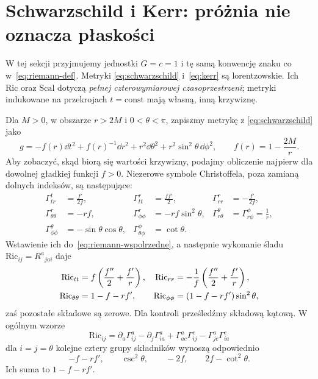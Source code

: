 \section{Schwarzschild i Kerr: próżnia nie oznacza płaskości}

W tej sekcji przyjmujemy jednostki $G=c=1$ i tę samą
konwencję znaku co w~\eqref{eq:riemann-def}. Metryki
\eqref{eq:schwarzschild} i~\eqref{eq:kerr} są
lorentzowskie. Ich $\mathrm{Ric}$ oraz $\mathrm{Scal}$
dotyczą \emph{pełnej czterowymiarowej czasoprzestrzeni};
metryki indukowane na przekrojach $t=\mathrm{const}$
mają własną, inną krzywiznę.

\begin{przyklad}
\label{prz:krzywizna-schwarzschild}
Dla $M>0$, w obszarze $r>2M$ i $0<\theta<\pi$, zapiszmy metrykę z
\eqref{eq:schwarzschild} jako
\[
 g=-f(r)\dd t^2+f(r)^{-1}\dd r^2
             +r^2\dd\theta^2+r^2\sin^2\theta\,\dd\phi^2,
 \qquad f(r)=1-\frac{2M}{r}.
\]
Aby zobaczyć, skąd biorą się wartości krzywizny,
podajmy obliczenie najpierw dla dowolnej gładkiej funkcji $f>0$.
Niezerowe symbole Christoffela, poza zamianą
dolnych indeksów, są następujące:
\begin{align*}
 \Gamma^t_{tr}&=\frac{f'}{2f},&
 \Gamma^r_{tt}&=\frac{ff'}2,&
 \Gamma^r_{rr}&=-\frac{f'}{2f},\\
 \Gamma^r_{\theta\theta}&=-rf,&
 \Gamma^r_{\phi\phi}&=-rf\sin^2\theta,&
 \Gamma^\theta_{r\theta}&=\Gamma^\phi_{r\phi}=\frac1r,\\
 \Gamma^\theta_{\phi\phi}&=-\sin\theta\cos\theta,&
 \Gamma^\phi_{\theta\phi}&=\cot\theta.
\end{align*}
Wstawienie ich do~\eqref{eq:riemann-wspolrzedne},
a następnie wykonanie śladu
$\mathrm{Ric}_{ij}=R^a{}_{j a i}$ daje
\begin{align}\label{eq:ricci-f-sferyczna}
 \mathrm{Ric}_{tt}&=f\left(\frac{f''}{2}+\frac{f'}r\right),
 &\mathrm{Ric}_{rr}&=-\frac1f
               \left(\frac{f''}{2}+\frac{f'}r\right),\notag\\
 \mathrm{Ric}_{\theta\theta}&=1-f-rf',
 &\mathrm{Ric}_{\phi\phi}&=(1-f-rf')\sin^2\theta,
\end{align}
zaś pozostałe składowe są zerowe. Dla kontroli
prześledźmy składową kątową. W ogólnym wzorze
\[
 \mathrm{Ric}_{ij}=\partial_a\Gamma^a_{ij}
   -\partial_j\Gamma^a_{ia}
   +\Gamma^a_{ac}\Gamma^c_{ij}
   -\Gamma^a_{jc}\Gamma^c_{ia}
\]
dla $i=j=\theta$ kolejne cztery grupy składników
wynoszą odpowiednio
\[
 -f-rf',\qquad \csc^2\theta,\qquad -2f,
 \qquad 2f-\cot^2\theta.
\]
Ich suma to $1-f-rf'$.

\end{przyklad}
